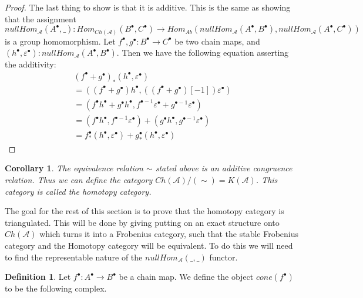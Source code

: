 \documentclass[11pt]{article}
\newtheorem{corollary}{Corollary}[theorem]
\theoremstyle{definition}
\newtheorem{definition}{Definition}[section]
\theoremstyle{remark}
\newcommand{\chain}[1]{#1^{\bullet}}
\begin{document}
\begin{proof}
                The last thing to show is that it is additive. This is the same as showing that the assignment $nullHom_{\mathcal{A}}(\chain{A},\_):Hom_{Ch(\mathcal{A})}(\chain{B},\chain{C})\rightarrow Hom_{Ab}(nullHom_{\mathcal{A}}(\chain{A},\chain{B}),nullHom_{\mathcal{A}}(\chain{A},\chain{C}))$ is a group homomorphism. Let $\chain{f},\chain{g}:\chain{B}\rightarrow\chain{C}$ be two chain maps, and $(\chain{h},\chain{\varepsilon}):nullHom_{\mathcal{A}}(\chain{A},\chain{B})$. Then we have the following equation asserting the additivity:
                \begin{align*}
                    (\chain{f}+\chain{g})_*(\chain{h},\chain{\varepsilon})\\
                    =((\chain{f}+\chain{g})\chain{h},((\chain{f}+\chain{g})[-1])\chain{\varepsilon})\\
                    =(\chain{f}\chain{h}+\chain{g}\chain{h},f^{\bullet-1}\chain{\varepsilon}+g^{\bullet-1}\chain{\varepsilon})\\
                    =(\chain{f}\chain{h},f^{\bullet-1}\chain{\varepsilon})+(\chain{g}\chain{h},g^{\bullet-1}\chain{\varepsilon})\\
                    =\chain{f}_*(\chain{h},\chain{\varepsilon})+\chain{g}_*(\chain{h},\chain{\varepsilon})
                \end{align*}
            \end{proof}

            \begin{corollary}
                The equivalence relation $\sim$ stated above is an additive congruence relation. Thus we can define the category $Ch(\mathcal{A})/(\sim) = K(\mathcal{A})$. This category is called the homotopy category.
            \end{corollary}

            The goal for the rest of this section is to prove that the homotopy category is triangulated. This will be done by giving putting on an exact structure onto $Ch(\mathcal{A})$ which turns it into a Frobenius category, such that the stable Frobenius category and the Homotopy category will be equivalent. To do this we will need to find the representable nature of the $nullHom_{\mathcal{A}}(\_,\_)$ functor.

            \begin{definition}
                Let $\chain{f}:\chain{A}\rightarrow\chain{B}$ be a chain map. We define the object $cone(\chain{f})$ to be the following complex.
                \begin{center}
                \end{center}
            \end{definition}
\end{document}

